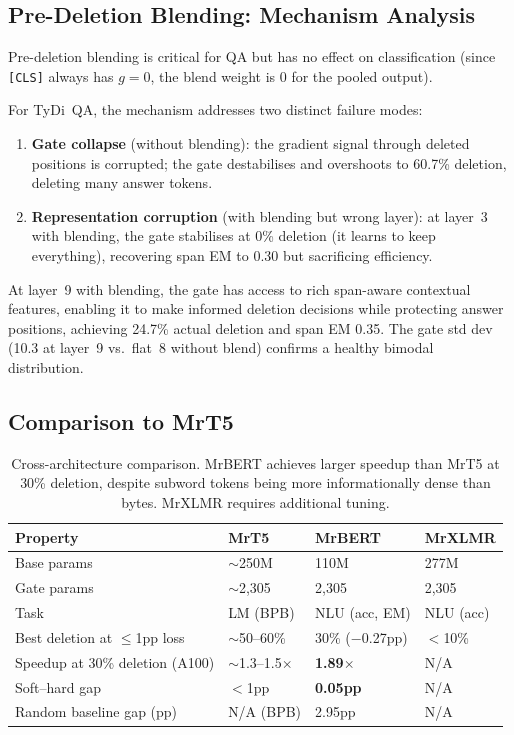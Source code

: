 \documentclass[11pt,a4paper]{article}
\begin{document}
\subsection{Pre-Deletion Blending: Mechanism Analysis}

Pre-deletion blending is critical for QA but has no effect on classification (since \texttt{[CLS]} always has $g=0$, the blend weight is 0 for the pooled output).

For TyDi~QA, the mechanism addresses two distinct failure modes:
\begin{enumerate}[nosep]
    \item \textbf{Gate collapse} (without blending): the gradient signal through deleted positions is corrupted; the gate destabilises and overshoots to 60.7\% deletion, deleting many answer tokens.
    \item \textbf{Representation corruption} (with blending but wrong layer): at layer~3 with blending, the gate stabilises at 0\% deletion (it learns to keep everything), recovering span EM to 0.30 but sacrificing efficiency.
\end{enumerate}

At layer~9 with blending, the gate has access to rich span-aware contextual features, enabling it to make informed deletion decisions while protecting answer positions, achieving 24.7\% actual deletion and span EM 0.35. The gate std dev (10.3 at layer~9 vs.\ flat~8 without blend) confirms a healthy bimodal distribution.


\subsection{Comparison to MrT5}

\begin{table}[h]
\centering\small
\begin{tabular}{@{}llll@{}}
\toprule
\textbf{Property} & \textbf{MrT5} & \textbf{MrBERT} & \textbf{MrXLMR} \\
\midrule
Base params                             & $\sim$250M     & 110M            & 277M \\
Gate params                             & $\sim$2,305    & 2,305           & 2,305 \\
Task                                    & LM (BPB)       & NLU (acc, EM)   & NLU (acc) \\
Best deletion at $\leq$1pp loss         & $\sim$50--60\% & 30\% ($-$0.27pp) & $<$10\% \\
Speedup at 30\% deletion (A100)         & $\sim$1.3--1.5$\times$ & \textbf{1.89$\times$} & N/A \\
Soft--hard gap                          & $<$1pp         & \textbf{0.05pp}  & N/A \\
Random baseline gap (pp)                & N/A (BPB)      & 2.95pp          & N/A \\
\bottomrule
\end{tabular}
\caption{Cross-architecture comparison. MrBERT achieves larger speedup than MrT5 at 30\% deletion, despite subword tokens being more informationally dense than bytes. MrXLMR requires additional tuning.}
\label{tab:comparison-mrt5}
\end{table}
\end{document}

